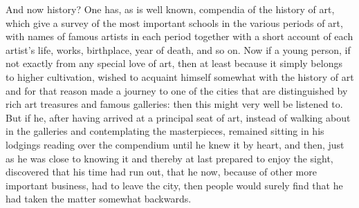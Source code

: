 \documentclass[12pt,a4paper,openany]{book}
\begin{document}
And now history? One has, as is well known, compendia
of the history of art, which give a survey of the
most important schools in the various periods of art, with
names of famous artists in each period together with a
short account of each artist's life, works,
birthplace, year of death, and so on. Now if a young person,
if not exactly from any special love of art, then
at least because it simply belongs to higher cultivation,
wished to acquaint himself somewhat with the history of art
and for that reason made a journey to one of the cities that
are distinguished by rich art treasures and famous galleries:
then this might very well be listened to. But if
he, after having arrived at a principal seat of art,
instead of walking about in the galleries and
contemplating the masterpieces, remained sitting in his lodgings
reading over the compendium until he knew it by heart,
and then, just as he was close to knowing it and thereby
at last prepared to enjoy the sight, discovered that
his time had run out, that he now, because of other
more important business, had to leave the city, then people would
surely find that he had taken the matter somewhat backwards.
\end{document}
